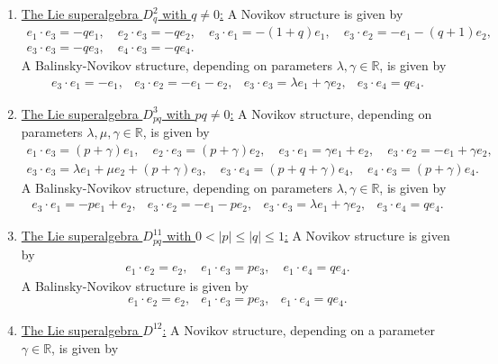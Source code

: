 \documentclass[12pt]{amsart}
\begin{document}
\begin{enumerate}
\[ \]
    \item \underline{The Lie superalgebra $D^2_q$ with $q\not = 0$:} A Novikov structure is given by  
    \[
\begin{array}{l}
e_1\cdot e_3= -q e_1 , \quad e_2\cdot e_3= -q  e_2, \quad e_3\cdot e_1=-(1+q)e_1, \quad e_3\cdot e_2= -e_1- (q+1)e_2, \\[2mm]
e_3\cdot e_3=-q e_3, \quad e_4\cdot e_3=-q e_4.
\end{array}
 \]
A Balinsky-Novikov structure, depending on parameters $\lambda, \gamma \in \mathbb R$, is given by
 \[
 \begin{array}{llll}
e_3 \cdot e_1= - e_1, & e_3 \cdot e_2=  -e_1-e_2, & 
e_3 \cdot e_3= \lambda e_1+\gamma e_2,& e_3\cdot e_4=q e_4.
 \end{array}
 \]
   \item \underline{The Lie superalgebra $D^3_{pq}$ with $pq\not = 0$:} A  Novikov structure, depending on parameters $\lambda, \mu,  \gamma \in \mathbb R$, is given by
    \[
\begin{array}{l}
e_1\cdot e_3= (p+\gamma) e_1 , \quad e_2\cdot e_3= (p+\gamma)  e_2, \quad e_3\cdot e_1= \gamma e_1+e_2, \quad e_3\cdot e_2= -e_1+ \gamma e_2, \\[2mm]
e_3\cdot e_3= \lambda e_1 +\mu e_2 + (p+\gamma)e_3, \quad e_3\cdot e_4=(p+q+\gamma) e_4, \quad e_4 \cdot e_3=(p+\gamma)e_4.
\end{array}
 \]
A Balinsky-Novikov structure, depending on parameters $\lambda, \gamma \in \mathbb R$, is given by
 \[
 \begin{array}{llll}
e_3 \cdot e_1= - p e_1 + e_2, & e_3 \cdot e_2=  -e_1- p e_2, & 
e_3 \cdot e_3= \lambda e_1+\gamma e_2,& e_3\cdot e_4=q e_4.
 \end{array}
 \]
  \item \underline{The Lie superalgebra $D^{11}_{pq}$ with $0<|p|\leq |q|\leq 1$:} A Novikov structure is given by 
    \[
\begin{array}{l}
e_1\cdot e_2=  e_2 , \quad e_1\cdot e_3= p  e_3, \quad e_1\cdot e_4= q e_4.
\end{array}
 \]
A Balinsky-Novikov structure is given by
 \[
 \begin{array}{llll}
e_1 \cdot e_2=  e_2, & e_1 \cdot e_3=p e_3, & 
e_1 \cdot e_4= q e_4. 
 \end{array}
 \]
    \item \underline{The Lie superalgebra $D^{12}$:} A Novikov structure, depending on  a parameter $ \gamma \in \mathbb R$, is given by
    \[
\begin{array}{l}

\end{array}\]
\end{enumerate}
\end{document}
